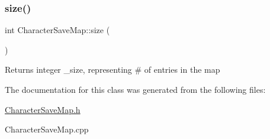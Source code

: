 \subsubsection{\texorpdfstring{size()}{size()}}
{\footnotesize\ttfamily int Character\+Save\+Map\+::size (\begin{DoxyParamCaption}{ }\end{DoxyParamCaption})}

\begin{DoxyReturn}{Returns}
integer \+\_\+size, representing \# of entries in the map 
\end{DoxyReturn}


The documentation for this class was generated from the following files\+:\begin{DoxyCompactItemize}
\item 
\hyperlink{_character_save_map_8h}{Character\+Save\+Map.\+h}\item 
Character\+Save\+Map.\+cpp\end{DoxyCompactItemize}
